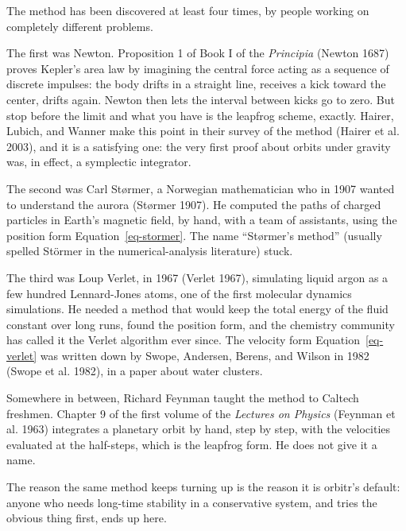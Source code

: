 \documentclass[
  10.5pt,
  letterpaper,
]{scrbook}
\theoremstyle{plain}
\theoremstyle{remark}
\begin{document}
\begin{tcolorbox}[enhanced jigsaw, arc=.35mm, bottomrule=.15mm, bottomtitle=1mm, breakable, colback=white, colbacktitle=quarto-callout-note-color!10!white, colframe=quarto-callout-note-color-frame, coltitle=black, left=2mm, leftrule=.75mm, opacityback=0, opacitybacktitle=0.6, rightrule=.15mm, title={Where it comes from}, titlerule=0mm, toprule=.15mm, toptitle=1mm]

The method has been discovered at least four times, by people working on
completely different problems.

The first was Newton. Proposition 1 of Book I of the \emph{Principia}
(Newton 1687) proves Kepler's area law by imagining the central force
acting as a sequence of discrete impulses: the body drifts in a straight
line, receives a kick toward the center, drifts again. Newton then lets
the interval between kicks go to zero. But stop before the limit and
what you have is the leapfrog scheme, exactly. Hairer, Lubich, and
Wanner make this point in their survey of the method (Hairer et al.
2003), and it is a satisfying one: the very first proof about orbits
under gravity was, in effect, a symplectic integrator.

The second was Carl Størmer, a Norwegian mathematician who in 1907
wanted to understand the aurora (Størmer 1907). He computed the paths of
charged particles in Earth's magnetic field, by hand, with a team of
assistants, using the position form Equation~\ref{eq-stormer}. The name
``Størmer's method'' (usually spelled Störmer in the numerical-analysis
literature) stuck.

The third was Loup Verlet, in 1967 (Verlet 1967), simulating liquid
argon as a few hundred Lennard-Jones atoms, one of the first molecular
dynamics simulations. He needed a method that would keep the total
energy of the fluid constant over long runs, found the position form,
and the chemistry community has called it the Verlet algorithm ever
since. The velocity form Equation~\ref{eq-verlet} was written down by
Swope, Andersen, Berens, and Wilson in 1982 (Swope et al. 1982), in a
paper about water clusters.

Somewhere in between, Richard Feynman taught the method to Caltech
freshmen. Chapter 9 of the first volume of the \emph{Lectures on
Physics} (Feynman et al. 1963) integrates a planetary orbit by hand,
step by step, with the velocities evaluated at the half-steps, which is
the leapfrog form. He does not give it a name.

The reason the same method keeps turning up is the reason it is orbitr's
default: anyone who needs long-time stability in a conservative system,
and tries the obvious thing first, ends up here.

\end{tcolorbox}
\end{document}
